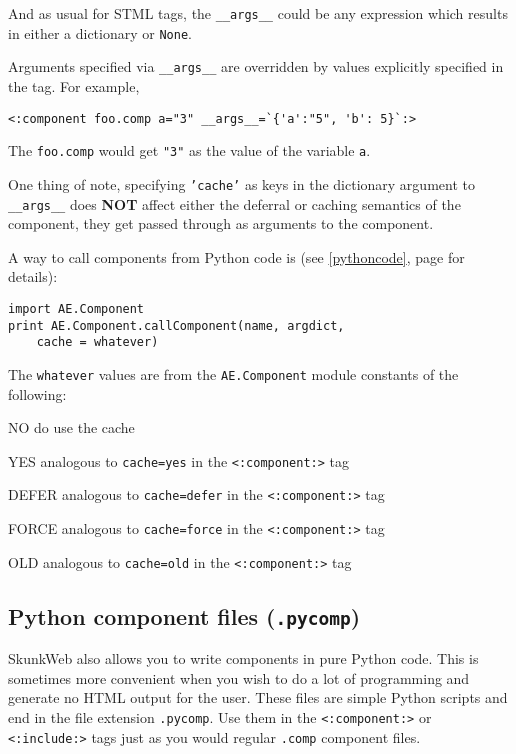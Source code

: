\documentclass{manual}
\begin{document}
{{And as usual for STML tags, the \texttt{__args__} could be any
expression which results in either a dictionary or \texttt{None}.

Arguments specified via \texttt{__args__} are overridden by values
explicitly specified in the tag.  For example,
\begin{verbatim}
<:component foo.comp a="3" __args__=`{'a':"5", 'b': 5}`:>
\end{verbatim}
The \texttt{foo.comp} would get \texttt{"3"} as the value of the
variable \texttt{a}.

One thing of note, specifying \texttt{'cache'} as keys in the
dictionary argument to \texttt{__args__} does \textbf{NOT} affect
either the deferral or caching semantics of the component, they get
passed through as arguments to the component.

A way to call components from Python code is (see \ref{pythoncode},
page \pageref{pythoncode} for details):
\begin{verbatim}
import AE.Component
print AE.Component.callComponent(name, argdict, 
	cache = whatever)
\end{verbatim}
The \texttt{whatever} values are from the \texttt{AE.Component} module constants of the following:
\label{whatevervals}
\begin{argdesc}
\item[NO] do use the cache
\item[YES] analogous to \texttt{cache=yes} in the \texttt{<:component:>} tag
\item[DEFER] analogous to \texttt{cache=defer} in the
\texttt{<:component:>} tag
\item[FORCE] analogous to \texttt{cache=force} in the
\texttt{<:component:>} tag
\item[OLD] analogous to \texttt{cache=old} in the
\texttt{<:component:>} tag
\end{argdesc}

\subsection{Python component files (\texttt{.pycomp})}

SkunkWeb also allows you to write components in pure Python
code. This is sometimes more convenient when you wish to do a lot
of programming and generate no HTML output for the user. These files
are simple Python scripts and end in the file extension \texttt{.pycomp}.
Use them in the \texttt{<:component:>} or
\texttt{<:include:>} 
tags just as you would regular \texttt{.comp} component files.


}}
\end{document}
